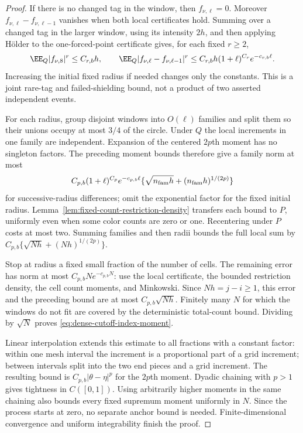 \documentclass[11pt,letterpaper]{article}
\begin{document}
\begin{proof}
If there is no changed tag in the window, then
$f_{\nu,\ell}=0$. Moreover
$f_{\nu,\ell}-f_{\nu,\ell-1}$ vanishes when both local
certificates hold. Summing over a changed tag in the larger
window, using its intensity $2h$, and then applying
H\"older to the one-forced-point certificate gives, for
each fixed $r\ge2$,
\[
 \EE_Q|f_{\nu,8}|^r\le C_{r,b}h,\qquad
 \EE_Q|f_{\nu,\ell}-f_{\nu,\ell-1}|^r
       \le C_{r,b}h(1+\ell)^{C_r}e^{-c_{r,b}\ell}.
\]
Increasing the initial fixed radius if needed changes only
the constants. This is a joint rare-tag and failed-shielding
bound, not a product of two asserted independent events.

For each radius, group disjoint windows into $O(\ell)$
families and split them so their unions occupy at most
$3/4$ of the circle. Under $Q$ the local increments in
one family are independent. Expansion of the centered
$2p$th moment has no singleton factors. The preceding
moment bounds therefore give a family norm at most
\[
 C_{p,b}(1+\ell)^{C_p}e^{-c_{p,b}\ell}
       \{\sqrt{n_{\rm fam}h}+(n_{\rm fam}h)^{1/(2p)}\}
\]
for successive-radius differences; omit the exponential
factor for the fixed initial radius.
Lemma~\ref{lem:fixed-count-restriction-density} transfers
each bound to $P$, uniformly even when some color counts
are zero or one. Recentering under $P$ costs at most two.
Summing families and then radii bounds the full local sum
by $C_{p,b}\{\sqrt{Nh}+(Nh)^{1/(2p)}\}$.

Stop at radius a fixed small fraction of the number of
cells. The remaining error has norm at most
$C_{p,b}N e^{-c_{p,b}N}$: use the local certificate,
the bounded restriction density, the cell count moments,
and Minkowski. Since $Nh=j-i\ge1$, this error and the
preceding bound are at most $C_{p,b}\sqrt{Nh}$.
Finitely many $N$ for which the windows do not fit are
covered by the deterministic total-count bound.
Dividing by $\sqrt N$ proves
\eqref{eq:dense-cutoff-index-moment}.

Linear interpolation extends this estimate to all
fractions with a constant factor: within one mesh interval
the increment is a proportional part of a grid increment;
between intervals split into the two end pieces and a
grid increment. The resulting bound is
$C_{p,b}|\theta-\eta|^p$ for the $2p$th moment.
Dyadic chaining with $p>1$ gives tightness in $C([0,1])$.
Using arbitrarily higher moments in the same chaining
also bounds every fixed supremum moment uniformly in $N$.
Since the process starts at zero, no separate anchor bound
is needed. Finite-dimensional convergence and uniform
integrability finish the proof.
\end{proof}
\end{document}
